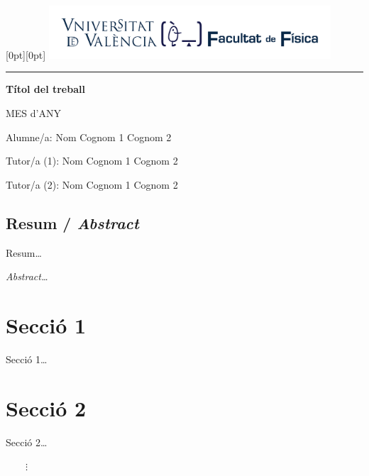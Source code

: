 \documentclass[12pt]{article}
\begin{document}
\begin{titlepage}
   \noindent\raisebox{0pt}[0pt][0pt]{
	\includegraphics[width=10.5cm]{marca-Facultat-Fisica-UV-1-linia.pdf}}\par
   \vspace{8.5cm}
   {\centering
      \par
      \rule{16.13cm}{1.5pt}\par
      \vspace{4.5cm}
      {\bfseries\sffamily\LARGE Títol del treball}\par %
   }
   \vfill
   {\raggedleft\sffamily
		MES d'ANY\par %
      \vspace{\baselineskip}
		Alumne/a: Nom Cognom 1 Cognom 2\par %
      \vspace{\baselineskip}
		Tutor/a (1): Nom Cognom 1 Cognom 2\par %
		Tutor/a (2): Nom Cognom 1 Cognom 2\par %
   }
\end{titlepage}
\restoregeometry
\subsection*{Resum / \emph{Abstract}}
Resum\ldots
\vspace{\baselineskip}
\begin{otherlanguage}{english}\itshape
    \noindent Abstract\ldots
\end{otherlanguage}
\section{Secció 1}
Secció 1\ldots
\section{Secció 2}
Secció 2\ldots
\mbox{}\par$\qquad{\vdots}$
\addtocounter{section}{96} %
\end{document}
